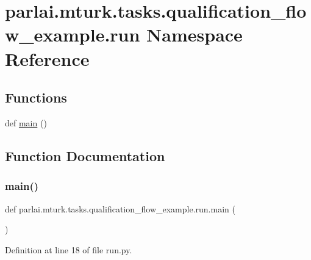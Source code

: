 \hypertarget{namespaceparlai_1_1mturk_1_1tasks_1_1qualification__flow__example_1_1run}{}\section{parlai.\+mturk.\+tasks.\+qualification\+\_\+flow\+\_\+example.\+run Namespace Reference}
\label{namespaceparlai_1_1mturk_1_1tasks_1_1qualification__flow__example_1_1run}
\subsection*{Functions}
\begin{DoxyCompactItemize}
\item 
def \hyperlink{namespaceparlai_1_1mturk_1_1tasks_1_1qualification__flow__example_1_1run_a4bca4106989cf4085b207d8e5c0e66ab}{main} ()
\end{DoxyCompactItemize}


\subsection{Function Documentation}
\mbox{\label{namespaceparlai_1_1mturk_1_1tasks_1_1qualification__flow__example_1_1run_a4bca4106989cf4085b207d8e5c0e66ab}} 
\subsubsection{\texorpdfstring{main()}{main()}}
{\footnotesize\ttfamily def parlai.\+mturk.\+tasks.\+qualification\+\_\+flow\+\_\+example.\+run.\+main (\begin{DoxyParamCaption}{ }\end{DoxyParamCaption})}



Definition at line 18 of file run.\+py.


